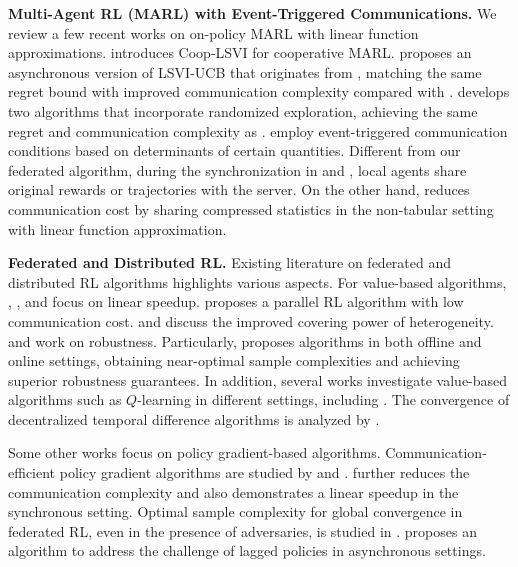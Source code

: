 \documentclass{article}
\begin{document}
\textbf{Multi-Agent RL (MARL) with Event-Triggered Communications.} We review a few recent works on on-policy MARL with linear function approximations. \cite{dubey2021provably} introduces Coop-LSVI for cooperative MARL. \cite{min2023cooperative} proposes an asynchronous version of LSVI-UCB that originates from \cite{jin2020provably}, matching the same regret bound with improved communication complexity compared with \cite{dubey2021provably}. \cite{hsu2024randomized} develops two algorithms that incorporate randomized exploration, achieving the same regret and communication complexity as \cite{min2023cooperative}. \cite{dubey2021provably,hsu2024randomized, min2023cooperative} employ event-triggered communication conditions based on determinants of certain quantities. Different from our federated algorithm, during the synchronization in \cite{dubey2021provably} and \cite{min2023cooperative}, local agents share original rewards or trajectories with the server. On the other hand, \cite{hsu2024randomized} reduces communication cost by sharing compressed statistics in the non-tabular setting with linear function approximation.

\textbf{Federated and Distributed RL.} Existing literature on federated and distributed RL algorithms highlights various aspects. For value-based algorithms, \cite{guo2015concurrent}, \cite{woo2023blessing}, and \cite{zheng2023federated} focus on linear speedup. \cite{agarwal2021communication} proposes a parallel RL algorithm with low communication cost. \cite{woo2023blessing} and \cite{woo2024federated} discuss the improved covering power of heterogeneity. \cite{chen2023byzantine} and \cite{wu2021byzantine} work on robustness. Particularly, \cite{chen2023byzantine} proposes algorithms in both offline and online settings, obtaining near-optimal sample complexities and achieving superior robustness guarantees. In addition, several works investigate value-based algorithms such as $Q$-learning in different settings, including \cite{anwar2021multi, beikmohammadi2024compressed, fan2023fedhql, jin2022federated, khodadadian2022federated, woo2023blessing, woo2024federated, yang2023federated, zhang2024finite, zhao2023federated}. The convergence of decentralized temporal difference algorithms is analyzed by \cite{chen2021multi,doan2019finite, doan2021finite, liu2023distributed, sun2020finite, wai2020convergence, wang2020decentralized, zeng2021finite}.

Some other works focus on policy gradient-based algorithms. Communication-efficient policy gradient algorithms are studied by \cite{chen2021communication} and \cite{fan2021fault}. \cite{lan2023improved} further reduces the communication complexity and also demonstrates a linear speedup in the synchronous setting. Optimal sample complexity for global convergence in federated RL, even in the presence of adversaries, is studied in \cite{ganesh2024global}. \cite{lan2024asynchronous} proposes an algorithm to address the challenge of lagged policies in asynchronous settings.
\end{document}
